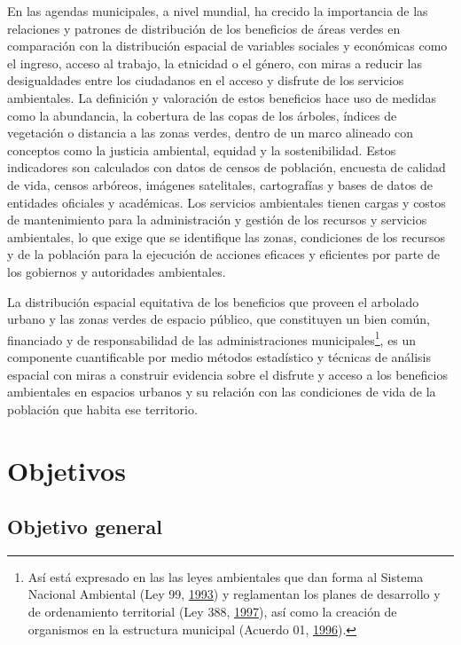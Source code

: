 \documentclass[12pt,a4paper,openany]{book}
\let\rmarkdownfootnote\footnote%
\def\footnote{\protect\rmarkdownfootnote}
\theoremstyle{definition}
\theoremstyle{definition}
\theoremstyle{definition}
\theoremstyle{remark}
\begin{document}
En las agendas municipales, a nivel mundial, ha crecido la importancia
de las relaciones y patrones de distribución de los beneficios de áreas
verdes en comparación con la distribución espacial de variables sociales
y económicas como el ingreso, acceso al trabajo, la etnicidad o el
género, con miras a reducir las desigualdades entre los ciudadanos en el
acceso y disfrute de los servicios ambientales. La definición y
valoración de estos beneficios hace uso de medidas como la abundancia,
la cobertura de las copas de los árboles, índices de vegetación o
distancia a las zonas verdes, dentro de un marco alineado con conceptos
como la justicia ambiental, equidad y la sostenibilidad. Estos
indicadores son calculados con datos de censos de población, encuesta de
calidad de vida, censos arbóreos, imágenes satelitales, cartografías y
bases de datos de entidades oficiales y académicas. Los servicios
ambientales tienen cargas y costos de mantenimiento para la
administración y gestión de los recursos y servicios ambientales, lo que
exige que se identifique las zonas, condiciones de los recursos y de la
población para la ejecución de acciones eficaces y eficientes por parte
de los gobiernos y autoridades ambientales.

La distribución espacial equitativa de los beneficios que proveen el
arbolado urbano y las zonas verdes de espacio público, que constituyen
un bien común, financiado y de responsabilidad de las administraciones
municipales\footnote{Así está expresado en las las leyes ambientales que
  dan forma al Sistema Nacional Ambiental (Ley 99,
  \protect\hyperlink{ref-ley99col}{1993}) y reglamentan los planes de
  desarrollo y de ordenamiento territorial (Ley 388,
  \protect\hyperlink{ref-ley388col}{1997}), así como la creación de
  organismos en la estructura municipal (Acuerdo 01,
  \protect\hyperlink{ref-cc_acuerdo01_1996}{1996}).}, es un componente
cuantificable por medio métodos estadístico y técnicas de análisis
espacial con miras a construir evidencia sobre el disfrute y acceso a
los beneficios ambientales en espacios urbanos y su relación con las
condiciones de vida de la población que habita ese territorio.

\section{Objetivos}\label{objetivos}

\subsection{Objetivo general}\label{objetivo-general}
\end{document}
